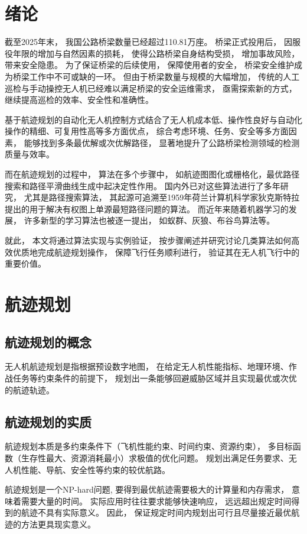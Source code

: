 \documentclass[12pt,a4paper,oneside,UTF8]{ctexart}
\begin{document}
\newpage\setcounter{page}{1}\section{绪论}
截至2025年末，
我国公路桥梁数量已经超过110.81万座\cite{ref1}。
桥梁正式投用后，
因服役年限的增加与自然因素的损耗，
使得公路桥梁自身结构受损，
增加事故风险，
带来安全隐患。
为了保证桥梁的后续使用，
保障使用者的安全，
桥梁安全维护成为桥梁工作中不可或缺的一环。
但由于桥梁数量与规模的大幅增加，
传统的人工巡检与手动操控无人机已经难以满足桥梁的安全运维需求，
亟需探索新的方式，继续提高巡检的效率、安全性和准确性\cite{ref2}。

基于航迹规划的自动化无人机控制方式结合了无人机成本低、操作性良好与自动化操作的精细、可复用性高等多方面优点，
综合考虑环境、任务、安全等多方面因素，
能够找到多条最优解或次优解路径，
显著地提升了公路桥梁检测领域的检测质量与效率。

而在航迹规划的过程中，
算法在多个步骤中，
如航迹图图化或栅格化，最优路径搜索和路径平滑曲线生成中起决定性作用。
国内外已对这些算法进行了多年研究，
尤其是路径搜索算法，
其起源可追溯至1959年荷兰计算机科学家狄克斯特拉提出的用于解决有权图上单源最短路径问题的算法。
而近年来随着机器学习的发展，
许多新型的学习算法也被逐一提出，
如蚁群、灰狼、布谷鸟算法等。

就此，
本文将通过算法实现与实例验证，
按步骤阐述并研究讨论几类算法如何高效优质地完成航迹规划操作，
保障飞行任务顺利进行，
验证其在无人机飞行中的重要价值。
\newpage\section{航迹规划}

\subsection{航迹规划的概念}
无人机航迹规划是指根据预设数字地图，
在给定无人机性能指标、地理环境、作战任务等约束条件的前提下，
规划出一条能够回避威胁区域并且实现最优或次优的航迹轨迹。

\subsection{航迹规划的实质}
航迹规划本质是多约束条件下（飞机性能约束、时间约束、资源约束），
多目标函数（生存性最大、资源消耗最小）求极值的优化问题。
规划出满足任务要求、无人机性能、导航、安全性等约束的较优航路。

航迹规划是一个NP-hard问题,
要得到最优航迹需要极大的计算量和内存需求，
意味着需要大量的时间。
实际应用时往往要求能够快速响应，
远远超出规定时间得到的航迹不具有实际意义。
因此，
保证规定时间内规划出可行且尽量接近最优航迹的方法更具现实意义。
\end{document}
